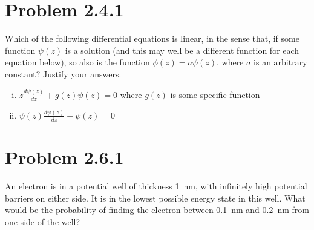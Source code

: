

\DeclareSIUnit{}





\pagebreak

\section*{Problem 2.4.1}

Which of the following differential equations is linear, in the sense
that, if some function $\psi(z)$ is a
solution (and this may well be a different function for each equation
below), so also is the function
$\phi(z) = a\psi(z)$, where $a$ is an arbitrary constant? Justify your answers.

\begin{enumerate}[(i)]
  \item $z\frac{d\psi(z)}{dz} + g(z)\psi(z) = 0$ where $g(z)$ is some
    specific function


  \item $\psi(z)\frac{d\psi(z)}{dz} + \psi(z) = 0$


\end{enumerate}

\pagebreak

\section*{Problem 2.6.1}

An electron is in a potential well of thickness \SI{1}{\nano\meter},
with infinitely high potential barriers on either
side. It is in the lowest possible energy state in this well. What
would be the probability of finding the
electron between \SI{0.1}{\nano\meter} and \SI{0.2}{\nano\meter} from
one side of the well?


